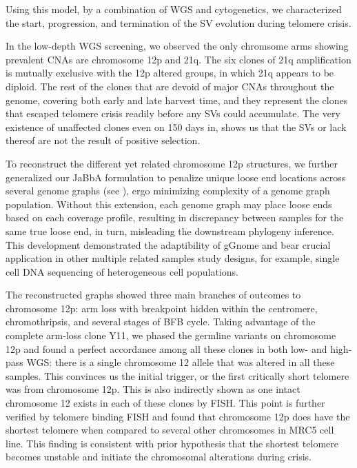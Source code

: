 \documentclass[phd,tocprelim]{cornell}
\begin{document}
Using this model, by a combination of WGS and cytogenetics, we characterized the start, progression, and termination of the SV evolution during telomere crisis. 

In the low-depth WGS screening, we observed the only chromsome arms showing prevalent CNAs are chromosome 12p and 21q. The six clones of 21q amplification is mutually exclusive with the 12p altered groups, in which 21q appears to be diploid. The rest of the clones that are devoid of major CNAs throughout the genome, covering both early and late harvest time, and they represent the clones that escaped telomere crisis readily before any SVs could accumulate. The very existence of unaffected clones even on 150 days in, shows us that the SVs or lack thereof are not the result of positive selection.

To reconstruct the different yet related chromosome 12p structures, we further generalized our JaBbA formulation to penalize unique loose end locations across several genome graphs (see ), ergo minimizing complexity of a genome graph population. Without this extension, each genome graph may place loose ends based on each coverage profile, resulting in discrepancy between samples for the same true loose end, in turn, misleading the downstream phylogeny inference. This development demonstrated the adaptibility of gGnome and bear crucial application in other multiple related samples study designs, for example, single cell DNA sequencing of heterogeneous cell populations.

The reconstructed graphs showed three main branches of outcomes to chromosome 12p: arm loss with breakpoint hidden within the centromere, chromothripsis, and several stages of BFB cycle. Taking advantage of the complete arm-loss clone Y11, we phased the germline variants on chromosome 12p and found a perfect accordance among all these clones in both low- and high-pass WGS: there is a single chromosome 12 allele that was altered in all these samples. This convinces us the initial trigger, or the first critically short telomere was from chromosome 12p. This is also indirectly shown as one intact chromosome 12 exists in each of these clones by FISH. This point is further verified by telomere binding FISH and found that chromosome 12p does have the shortest telomere when compared to several other chromosomes in MRC5 cell line. This finding is consistent with prior hypothesis that the shortest telomere becomes unstable and initiate the chromosomal alterations during crisis.
\end{document}
